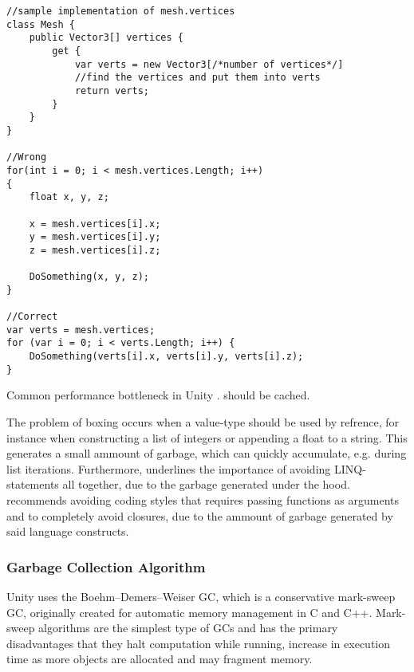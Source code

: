 \begin{listing}
\begin{verbatim}
//sample implementation of mesh.vertices
class Mesh {
    public Vector3[] vertices {
        get {
            var verts = new Vector3[/*number of vertices*/]
            //find the vertices and put them into verts
            return verts;
        }
    }
}

//Wrong
for(int i = 0; i < mesh.vertices.Length; i++)
{
    float x, y, z;

    x = mesh.vertices[i].x;
    y = mesh.vertices[i].y;
    z = mesh.vertices[i].z;

    DoSomething(x, y, z);
}

//Correct
var verts = mesh.vertices;
for (var i = 0; i < verts.Length; i++) {
    DoSomething(verts[i].x, verts[i].y, verts[i].z);
}
\end{verbatim}
\caption{Common performance bottleneck in Unity \cite{unity:heap}.  should be cached.} \label{lst:unity:array:prop}
\end{listing}

The problem of boxing occurs when a value-type should be used by refrence, for instance when constructing a list of integers or appending a float to a string. This generates a small ammount of garbage, which can quickly accumulate, e.g. during list iterations. Furthermore, \cite{unity:optimisation} underlines the importance of avoiding \gls{LINQ}-statements all together, due to the garbage generated under the hood. \cite{unity:heap} recommends avoiding coding styles that requires passing functions as arguments and to completely avoid closures, due to the ammount of garbage generated by said language constructs.

\subsubsection{Garbage Collection Algorithm}
Unity uses the Boehm–Demers–Weiser \gls{GC}, which is a conservative mark-sweep \gls{GC}\cite{unity:heap}, originally created for automatic memory management in C and C++\cite{boehm2007transparent}. Mark-sweep algorithms are the simplest type of \glspl{GC} and has the primary disadvantages that they halt computation while running, increase in execution time as more objects are allocated and may fragment memory\cite{sestoft2017programming}.


